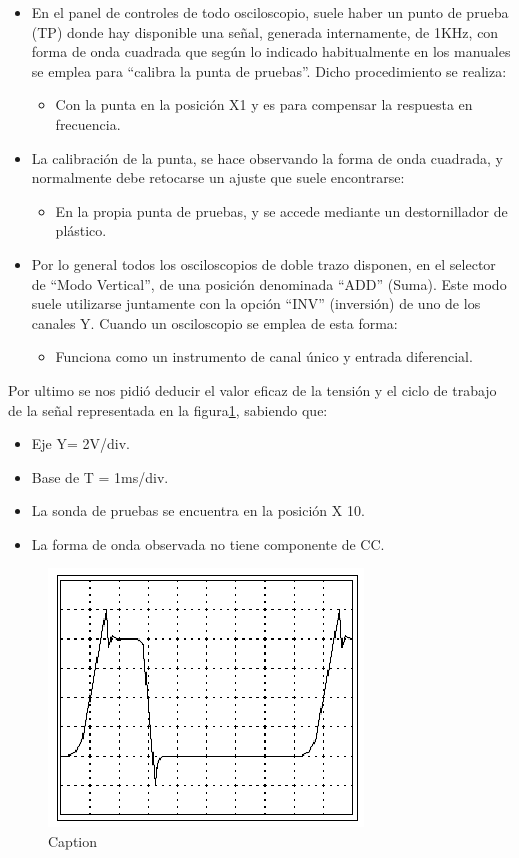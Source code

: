 \begin{itemize}
\begin{itemize}
    \end{itemize}
    \item[] En el panel de controles de todo osciloscopio, suele haber un punto de prueba (TP) donde hay disponible una señal, generada internamente, de 1KHz, con forma de onda cuadrada que según lo indicado habitualmente en los manuales se emplea para “calibra la punta de pruebas”. Dicho procedimiento se realiza:
    \begin{itemize}
        \item Con la punta en la posición X1 y es para compensar la respuesta en frecuencia.
    \end{itemize}
    \item[] La calibración de la punta, se hace observando la forma de onda cuadrada, y normalmente debe retocarse un ajuste que suele encontrarse:
    \begin{itemize}
        \item En la propia punta de pruebas, y se accede mediante un destornillador de plástico.
    \end{itemize}
    \item[] Por lo general todos los osciloscopios de doble trazo disponen, en el selector de “Modo Vertical”, de una posición denominada “ADD” (Suma). Este modo suele utilizarse juntamente con la opción “INV” (inversión) de uno de los canales Y. Cuando un osciloscopio se emplea de esta forma:
    \begin{itemize}
        \item Funciona como un instrumento de canal único y entrada diferencial.
    \end{itemize}
\end{itemize}
Por ultimo se nos pidió deducir el valor eficaz de la tensión y el ciclo de trabajo de la señal representada en la figura\ref{fig:ConcSeñ}, sabiendo que:
\begin{itemize}
    \item Eje Y= 2V/div.
    \item Base de T = 1ms/div. 
    \item La sonda de pruebas se encuentra en la posición X 10. 
    \item La forma de onda observada no tiene componente de CC.

\end{itemize}
\begin{figure}[H]
    \centering
    \includegraphics{Imagenes/ConcSeñ.png}
    \caption{Caption}
    \label{fig:ConcSeñ}
\end{figure}

